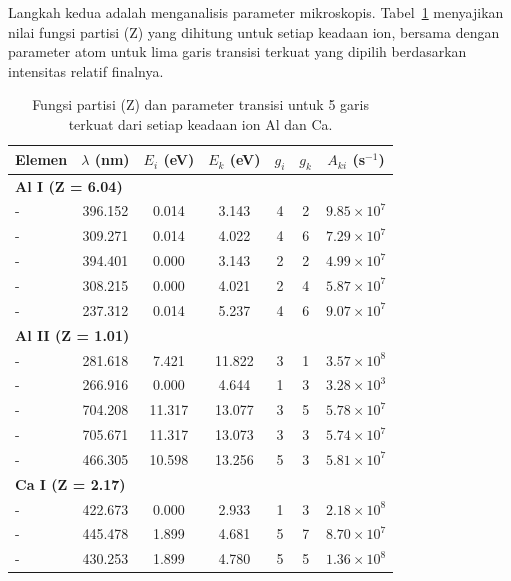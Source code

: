Langkah kedua adalah menganalisis parameter mikroskopis. Tabel~\ref{tab:lines_and_partition} menyajikan nilai fungsi partisi (Z) yang dihitung untuk setiap keadaan ion, bersama dengan parameter atom untuk lima garis transisi terkuat yang dipilih berdasarkan intensitas relatif finalnya.

\begin{table}[H]
    \centering
    \caption{Fungsi partisi (Z) dan parameter transisi untuk 5 garis terkuat dari setiap keadaan ion Al dan Ca.}
    \label{tab:lines_and_partition}
    \small
    \begin{tabular}{lcccccc}
        \toprule
        \textbf{Elemen} & \textbf{$\lambda$ (nm)} & \textbf{$E_i$ (eV)} & \textbf{$E_k$ (eV)} & \textbf{$g_i$} & \textbf{$g_k$} & \textbf{$A_{ki}$ (s$^{-1}$)} \\
        \midrule
        \multicolumn{7}{l}{\textbf{Al I (Z = 6.04)}} \\
        \quad - & 396.152 & 0.014 & 3.143 & 4 & 2 & $9.85 \times 10^7$ \\
        \quad - & 309.271 & 0.014 & 4.022 & 4 & 6 & $7.29 \times 10^7$ \\
        \quad - & 394.401 & 0.000 & 3.143 & 2 & 2 & $4.99 \times 10^7$ \\
        \quad - & 308.215 & 0.000 & 4.021 & 2 & 4 & $5.87 \times 10^7$ \\
        \quad - & 237.312 & 0.014 & 5.237 & 4 & 6 & $9.07 \times 10^7$ \\
        \midrule
        \multicolumn{7}{l}{\textbf{Al II (Z = 1.01)}} \\
        \quad - & 281.618 & 7.421 & 11.822 & 3 & 1 & $3.57 \times 10^8$ \\
        \quad - & 266.916 & 0.000 & 4.644 & 1 & 3 & $3.28 \times 10^3$ \\
        \quad - & 704.208 & 11.317 & 13.077 & 3 & 5 & $5.78 \times 10^7$ \\
        \quad - & 705.671 & 11.317 & 13.073 & 3 & 3 & $5.74 \times 10^7$ \\
        \quad - & 466.305 & 10.598 & 13.256 & 5 & 3 & $5.81 \times 10^7$ \\
        \midrule
        \multicolumn{7}{l}{\textbf{Ca I (Z = 2.17)}} \\
        \quad - & 422.673 & 0.000 & 2.933 & 1 & 3 & $2.18 \times 10^8$ \\
        \quad - & 445.478 & 1.899 & 4.681 & 5 & 7 & $8.70 \times 10^7$ \\
        \quad - & 430.253 & 1.899 & 4.780 & 5 & 5 & $1.36 \times 10^8$ \\

\end{tabular}
\end{table}
